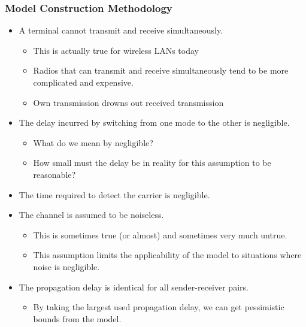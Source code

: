 \subsubsection{Model Construction Methodology}\label{subsubsec:Kleinrock_Tobagi_Model_Method}
\begin{itemize}[noitemsep]
\item A terminal cannot transmit and receive simultaneously.
  \begin{itemize}[noitemsep]
  \item This is actually true for wireless LANs today
  \item Radios that can transmit and receive simultaneously tend to be more complicated and expensive.
  \item Own transmission drowns out received transmission
  \end{itemize}
\item The delay incurred by switching from one mode to the other is negligible.
  \begin{itemize}[noitemsep]
  \item What do we mean by negligible?
  \item How small must the delay be in reality for this assumption to be reasonable?
  \end{itemize}
\item The time required to detect the carrier is negligible.
\item The channel is assumed to be noiseless.
  \begin{itemize}[noitemsep]
  \item This is sometimes true (or almost) and sometimes very much untrue.
  \item This assumption limits the applicability of the model to situations where noise is negligible.
  \end{itemize}
\item The propagation delay is identical for all sender-receiver pairs.
  \begin{itemize}[noitemsep]
  \item By taking the largest used propagation delay, we can get pessimistic bounds from the model.
  \end{itemize}
\end{itemize}

